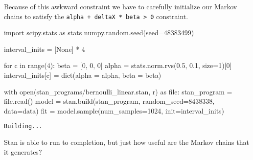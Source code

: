 \documentclass[
  letterpaper,
  DIV=11,
  numbers=noendperiod]{scrartcl}
\newenvironment{Shaded}{\begin{snugshade}}{\end{snugshade}}
\newcommand{\BuiltInTok}[1]{\textcolor[rgb]{0.00,0.23,0.31}{#1}}
\newcommand{\ControlFlowTok}[1]{\textcolor[rgb]{0.00,0.23,0.31}{#1}}
\newcommand{\DecValTok}[1]{\textcolor[rgb]{0.68,0.00,0.00}{#1}}
\newcommand{\FloatTok}[1]{\textcolor[rgb]{0.68,0.00,0.00}{#1}}
\newcommand{\ImportTok}[1]{\textcolor[rgb]{0.00,0.46,0.62}{#1}}
\newcommand{\KeywordTok}[1]{\textcolor[rgb]{0.00,0.23,0.31}{#1}}
\newcommand{\NormalTok}[1]{\textcolor[rgb]{0.00,0.23,0.31}{#1}}
\newcommand{\OperatorTok}[1]{\textcolor[rgb]{0.37,0.37,0.37}{#1}}
\newcommand{\StringTok}[1]{\textcolor[rgb]{0.13,0.47,0.30}{#1}}
\newcommand{\VariableTok}[1]{\textcolor[rgb]{0.07,0.07,0.07}{#1}}
\begin{document}
Because of this awkward constraint we have to carefully initialize our
Markov chains to satisfy the
\texttt{alpha\ +\ deltaX\ *\ beta\ \textgreater{}\ 0} constraint.

\begin{Shaded}
\begin{Highlighting}[]
\ImportTok{import}\NormalTok{ scipy.stats }\ImportTok{as}\NormalTok{ stats}
\NormalTok{numpy.random.seed(seed}\OperatorTok{=}\DecValTok{48383499}\NormalTok{)}

\NormalTok{interval\_inits }\OperatorTok{=}\NormalTok{ [}\VariableTok{None}\NormalTok{] }\OperatorTok{*} \DecValTok{4}

\ControlFlowTok{for}\NormalTok{ c }\KeywordTok{in} \BuiltInTok{range}\NormalTok{(}\DecValTok{4}\NormalTok{):}
\NormalTok{  beta }\OperatorTok{=}\NormalTok{ [}\DecValTok{0}\NormalTok{, }\DecValTok{0}\NormalTok{, }\DecValTok{0}\NormalTok{]}
\NormalTok{  alpha }\OperatorTok{=}\NormalTok{ stats.norm.rvs(}\FloatTok{0.5}\NormalTok{, }\FloatTok{0.1}\NormalTok{, size}\OperatorTok{=}\DecValTok{1}\NormalTok{)[}\DecValTok{0}\NormalTok{]}
\NormalTok{  interval\_inits[c] }\OperatorTok{=} \BuiltInTok{dict}\NormalTok{(alpha }\OperatorTok{=}\NormalTok{ alpha, beta }\OperatorTok{=}\NormalTok{ beta)}
\end{Highlighting}
\end{Shaded}

\begin{Shaded}
\begin{Highlighting}[]
\ControlFlowTok{with} \BuiltInTok{open}\NormalTok{(}\StringTok{\textquotesingle{}stan\_programs/bernoulli\_linear.stan\textquotesingle{}}\NormalTok{, }\StringTok{\textquotesingle{}r\textquotesingle{}}\NormalTok{) }\ImportTok{as} \BuiltInTok{file}\NormalTok{:}
\NormalTok{  stan\_program }\OperatorTok{=} \BuiltInTok{file}\NormalTok{.read()}
\NormalTok{model }\OperatorTok{=}\NormalTok{ stan.build(stan\_program, random\_seed}\OperatorTok{=}\DecValTok{8438338}\NormalTok{, data}\OperatorTok{=}\NormalTok{data)}
\NormalTok{fit }\OperatorTok{=}\NormalTok{ model.sample(num\_samples}\OperatorTok{=}\DecValTok{1024}\NormalTok{, init}\OperatorTok{=}\NormalTok{interval\_inits)}
\end{Highlighting}
\end{Shaded}

\begin{verbatim}
Building...
\end{verbatim}

Stan is able to run to completion, but just how useful are the Markov
chains that it generates?
\end{document}
